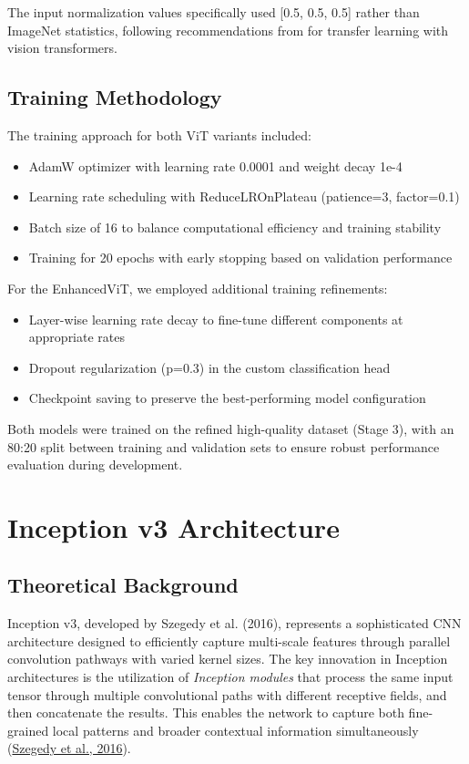 \documentclass[a4paper,12pt]{article}
\begin{document}
The input normalization values specifically used [0.5, 0.5, 0.5] rather than ImageNet statistics, following recommendations from\citep{touvron2021training} for transfer learning with vision transformers.

\subsection{Training Methodology}

The training approach for both ViT variants included:

\begin{itemize}
    \item AdamW optimizer with learning rate 0.0001 and weight decay 1e-4
    \item Learning rate scheduling with ReduceLROnPlateau (patience=3, factor=0.1)
    \item Batch size of 16 to balance computational efficiency and training stability
    \item Training for 20 epochs with early stopping based on validation performance
\end{itemize}

For the EnhancedViT, we employed additional training refinements:

\begin{itemize}
    \item Layer-wise learning rate decay to fine-tune different components at appropriate rates
    \item Dropout regularization (p=0.3) in the custom classification head
    \item Checkpoint saving to preserve the best-performing model configuration
\end{itemize}

Both models were trained on the refined high-quality dataset (Stage 3), with an 80:20 split between training and validation sets to ensure robust performance evaluation during development.



\section*{Inception v3 Architecture}

\subsection*{Theoretical Background}
Inception v3, developed by Szegedy et al. (2016), represents a sophisticated CNN architecture designed to efficiently capture multi-scale features through parallel convolution pathways with varied kernel sizes. The key innovation in Inception architectures is the utilization of \textit{Inception modules} that process the same input tensor through multiple convolutional paths with different receptive fields, and then concatenate the results. This enables the network to capture both fine-grained local patterns and broader contextual information simultaneously (\href{https://arxiv.org/abs/1512.00567}{Szegedy et al., 2016}).
\end{document}
